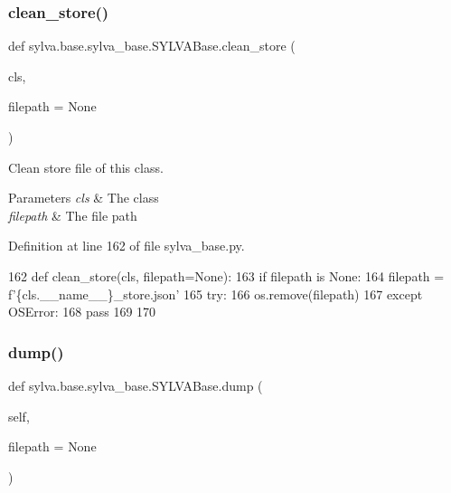 \subsubsection{\texorpdfstring{clean\+\_\+store()}{clean\_store()}}
{\footnotesize\ttfamily def sylva.\+base.\+sylva\+\_\+base.\+S\+Y\+L\+V\+A\+Base.\+clean\+\_\+store (\begin{DoxyParamCaption}\item[{}]{cls,  }\item[{}]{filepath = {\ttfamily None} }\end{DoxyParamCaption})}



Clean store file of this class. 


\begin{DoxyParams}{Parameters}
{\em cls} & The class \\
\hline
{\em filepath} & The file path \\
\hline
\end{DoxyParams}


Definition at line 162 of file sylva\+\_\+base.\+py.


\begin{DoxyCode}
162     \textcolor{keyword}{def }clean\_store(cls, filepath=None):
163         \textcolor{keywordflow}{if} filepath \textcolor{keywordflow}{is} \textcolor{keywordtype}{None}:
164             filepath = f\textcolor{stringliteral}{'\{cls.\_\_name\_\_\}\_store.json'}
165         \textcolor{keywordflow}{try}:
166             os.remove(filepath)
167         \textcolor{keywordflow}{except} OSError:
168             \textcolor{keywordflow}{pass}
169 
170 
\end{DoxyCode}
\mbox{\label{classsylva_1_1base_1_1sylva__base_1_1_s_y_l_v_a_base_a196978bd73392249f19f817bc1033d8e}} 
\subsubsection{\texorpdfstring{dump()}{dump()}}
{\footnotesize\ttfamily def sylva.\+base.\+sylva\+\_\+base.\+S\+Y\+L\+V\+A\+Base.\+dump (\begin{DoxyParamCaption}\item[{}]{self,  }\item[{}]{filepath = {\ttfamily None} }\end{DoxyParamCaption})}



